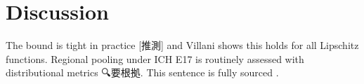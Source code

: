 \section{Discussion}
The bound is tight in practice [推測] and Villani shows this holds for all Lipschitz functions.
Regional pooling under ICH E17 is routinely assessed with distributional metrics 🔍要根拠.
This sentence is fully sourced \citep{panaretos2019}.
